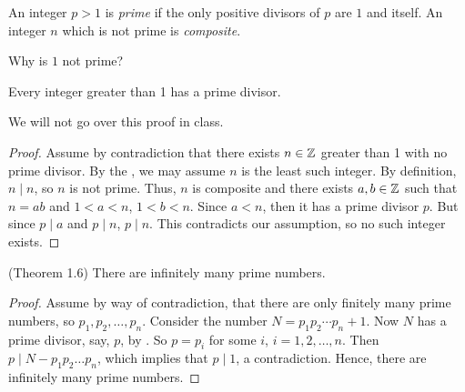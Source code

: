 \documentclass{ximera}
\begin{document}
\begin{defn}
An integer $p>1$ is \emph{prime} if the only positive divisors of $p$ are $1$ and itself. An integer $n$ which is not prime is \emph{composite}. 
\end{defn}

Why is $1$ not prime?


\begin{lemma}\label{lem:prime-composite}
 Every integer greater than 1 has a prime divisor.
\end{lemma}

We will not go over this proof in class.

\begin{proof} 
 Assume by contradiction that there exists $n\in\mathbb Z$ greater than 1 with no prime divisor. By the , we may assume $n$ is the least such integer. By definition, $n\mid n$, so $n$ is not prime. Thus, $n$ is composite and there exists $a,b\in\mathbb Z$ such that $n=ab$ and $1<a<n$, $1<b<n$. Since $a<n$, then it has a prime divisor $p$. But since $p\mid a$ and $p\mid n$, $p\mid n$. This contradicts our assumption, so no such integer exists.
\end{proof}


\begin{theorem}\label{thm:inf-primes}(Theorem 1.6)
 There are infinitely many prime numbers.
\end{theorem}
\begin{proof}
 Assume by way of contradiction, that there are only finitely many prime numbers, so $p_1,p_2,\dots,p_n$. Consider the number $N=p_1p_2\cdots p_n +1$. Now $N$ has a prime divisor, say, $p$, by . So $p=p_i$ for some $i$, $i=1,2,\dots,n$. Then $p\mid N-p_1p_2\dots p_n$, which implies that $p\mid 1$, a contradiction. Hence, there are infinitely many prime numbers.
\end{proof}
\end{document}
